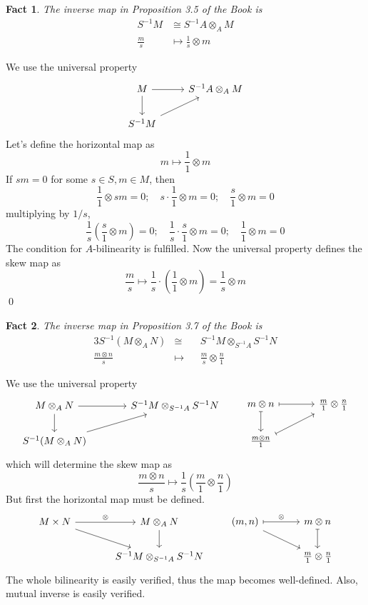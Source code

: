 \documentclass{article}
\newtheorem{theorem}{Fact}[section]
\begin{document}
\begin{theorem}
The inverse map in Proposition 3.5 of the Book is
\begin{align*}
S^{-1}M & \cong S^{-1}A \otimes_A M \\
\frac{m}{s} & \mapsto  \frac{1}{s} \otimes m
\end{align*}
\end{theorem}
We use the universal property
\[
\begin{tikzcd}
M \arrow{r} \arrow{d} & S^{-1}A \otimes_A M \\
S^{-1}M \arrow{ur}
\end{tikzcd}
\]
Let's define the horizontal map as 
\[
m \longmapsto \frac{1}{1} \otimes m
\]
If $sm = 0$ for some $s \in S, m \in M$, then 
\[
\frac{1}{1} \otimes sm = 0; \quad s \cdot \frac{1}{1} \otimes m = 0; \quad \frac{s}{1} \otimes m = 0 
\]
multiplying by $1/s$,
\[
\frac{1}{s}\left(\frac{s}{1} \otimes m \right) = 0; \quad \frac{1}{s}\cdot\frac{s}{1} \otimes m = 0; \quad \frac{1}{1} \otimes m = 0
\]
The condition for $A$-bilinearity is fulfilled. Now the universal property defines the skew map as
\[
\frac{m}{s} \longmapsto \frac{1}{s} \cdot \left( \frac{1}{1} \otimes m \right) = \frac{1}{s} \otimes m
\]
\qed

\begin{theorem}
The inverse map in Proposition 3.7 of the Book is
\begin{alignat*}{3}
S^{-1}(M \otimes_A N) & \cong && S^{-1}M \otimes_{S^{-1}A} S^{-1}N \\
\frac{m \otimes n}{s} & \longmapsto && \frac{m}{s} \otimes \frac{n}{1}
\end{alignat*}
\end{theorem}
We use the universal property
\[
\begin{tikzcd}[column sep=large]
M \otimes_A N \arrow{r} \arrow{d} & S^{-1}M \otimes_{S^{-1}A} S^{-1}N \\
S^{-1}(M \otimes_A N) \arrow{ur}
\end{tikzcd}
%
\qquad
%
\begin{tikzcd}[column sep=large]
m \otimes n \arrow[r, mapsto] \arrow[d, mapsto] & \frac{m}{1} \otimes \frac{n}{1} \\
\frac{m \otimes n}{1} \arrow[ur, mapsto]
\end{tikzcd}
\]
which will determine the skew map as 
\[
\frac{m \otimes n}{s} \mapsto \frac{1}{s} \left( \frac{m}{1} \otimes \frac{n}{1} \right)
\]
But first the horizontal map must be defined.
\[
\begin{tikzcd}[column sep=large]
M \times N \arrow{r}{\otimes} \arrow{rd} & M \otimes_A N \arrow{d} \\
& S^{-1}M \otimes_{S^{-1}A} S^{-1}N
\end{tikzcd}
%
\qquad
%
\begin{tikzcd}[column sep=large]
(m, n) \arrow[r, mapsto, "\otimes"] \arrow{rd} & m \otimes n \arrow[d, mapsto] \\
& \frac{m}{1} \otimes \frac{n}{1}
\end{tikzcd}
\]
The whole bilinearity is easily verified, thus the map becomes well-defined. Also, mutual inverse is easily verified.
\end{document}
